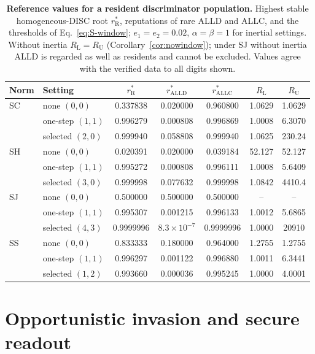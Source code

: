 \documentclass[fleqn,10pt]{article}
\theoremstyle{plain}
\theoremstyle{remark}
\newcommand{\ALLC}{\mathrm{ALLC}}
\newcommand{\ALLD}{\mathrm{ALLD}}
\newcommand{\rR}{r^*_{\mathrm R}}
\begin{document}
\begin{table}[htbp]
\centering\small
\caption{\textbf{Reference values for a resident discriminator population.} Highest stable homogeneous-DISC root $\rR$, reputations of rare ALLD and ALLC, and the thresholds of Eq.~\eqref{eq:S-window}; $e_1=e_2=0.02$, $\alpha=\beta=1$ for inertial settings. Without inertia $R_{\mathrm L}=R_{\mathrm U}$ (Corollary~\ref{cor:nowindow}); under SJ without inertia ALLD is regarded as well as residents and cannot be excluded. Values agree with the verified data to all digits shown.}
\label{tab:reference}
\begin{tabular}{@{}llccccc@{}}
\toprule
Norm & Setting & $\rR$ & $r^*_{\ALLD}$ & $r^*_{\ALLC}$ & $R_{\mathrm L}$ & $R_{\mathrm U}$\\
\midrule
SC & none $(0,0)$ & 0.337838 & 0.020000 & 0.960800 & 1.0629 & 1.0629\\
   & one-step $(1,1)$ & 0.996279 & 0.000808 & 0.996869 & 1.0008 & 6.3070\\
   & selected $(2,0)$ & 0.999940 & 0.058808 & 0.999940 & 1.0625 & 230.24\\
SH & none $(0,0)$ & 0.020391 & 0.020000 & 0.039184 & 52.127 & 52.127\\
   & one-step $(1,1)$ & 0.995272 & 0.000808 & 0.996111 & 1.0008 & 5.6409\\
   & selected $(3,0)$ & 0.999998 & 0.077632 & 0.999998 & 1.0842 & 4410.4\\
SJ & none $(0,0)$ & 0.500000 & 0.500000 & 0.500000 & -- & --\\
   & one-step $(1,1)$ & 0.995307 & 0.001215 & 0.996133 & 1.0012 & 5.6865\\
   & selected $(4,3)$ & 0.9999996 & $8.3\times10^{-7}$ & 0.9999996 & 1.0000 & 20910\\
SS & none $(0,0)$ & 0.833333 & 0.180000 & 0.964000 & 1.2755 & 1.2755\\
   & one-step $(1,1)$ & 0.996297 & 0.001122 & 0.996880 & 1.0011 & 6.3441\\
   & selected $(1,2)$ & 0.993660 & 0.000036 & 0.995245 & 1.0000 & 4.0001\\
\bottomrule
\end{tabular}
\end{table}

\section{Opportunistic invasion and secure readout}
\label{sec:opportunism}
\end{document}
